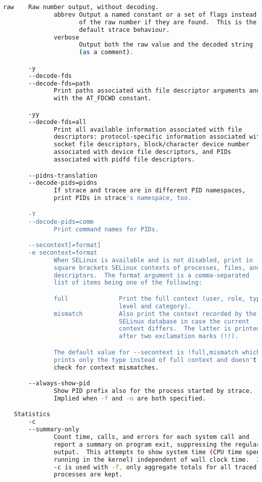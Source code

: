 {{\begin{lstlisting}[language=bash]
              raw    Raw number output, without decoding.
              abbrev Output a named constant or a set of flags instead
                     of the raw number if they are found.  This is the
                     default strace behaviour.
              verbose
                     Output both the raw value and the decoded string
                     (as a comment).

       -y
       --decode-fds
       --decode-fds=path
              Print paths associated with file descriptor arguments and
              with the AT_FDCWD constant.

       -yy
       --decode-fds=all
              Print all available information associated with file
              descriptors: protocol-specific information associated with
              socket file descriptors, block/character device number
              associated with device file descriptors, and PIDs
              associated with pidfd file descriptors.

       --pidns-translation
       --decode-pids=pidns
              If strace and tracee are in different PID namespaces,
              print PIDs in strace's namespace, too.

       -Y
       --decode-pids=comm
              Print command names for PIDs.

       --secontext[=format]
       -e secontext=format
              When SELinux is available and is not disabled, print in
              square brackets SELinux contexts of processes, files, and
              descriptors.  The format argument is a comma-separated
              list of items being one of the following:

              full              Print the full context (user, role, type
                                level and category).
              mismatch          Also print the context recorded by the
                                SELinux database in case the current
                                context differs.  The latter is printed
                                after two exclamation marks (!!).

              The default value for --secontext is !full,mismatch which
              prints only the type instead of full context and doesn't
              check for context mismatches.

       --always-show-pid
              Show PID prefix also for the process started by strace.
              Implied when -f and -o are both specified.

   Statistics
       -c
       --summary-only
              Count time, calls, and errors for each system call and
              report a summary on program exit, suppressing the regular
              output.  This attempts to show system time (CPU time spent
              running in the kernel) independent of wall clock time.  If
              -c is used with -f, only aggregate totals for all traced
              processes are kept.


\end{lstlisting}}}
